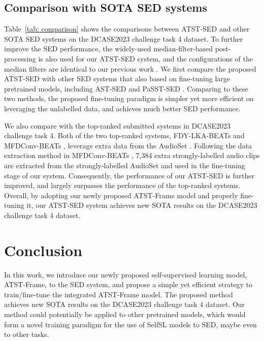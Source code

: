 \documentclass{article}
\begin{document}
\subsection{Comparison with SOTA SED systems}
Table~\ref{tab: comparison} shows the comparisons between ATST-SED and other SOTA SED systems on the DCASE2023 challenge task 4 dataset. To further improve the SED performance, the widely-used median-filter-based post-processing is also used for our ATST-SED system, and the configurations of the median filters are identical to our previous work \cite{shao22rct}.  We first compare the proposed ATST-SED with other SED systems that also based on fine-tuning large pretrained models, including AST-SED \cite{li2023ast} and PaSST-SED \cite{Li2023panns}. Comparing to these two methods, the proposed fine-tuning paradigm is simpler yet more efficient on leveraging the unlabelled data, and achieves much better SED performance. 

We also compare with the top-ranked submitted systems in DCASE2023 challenge task 4. Both of the two top-ranked systems, FDY-LKA-BEATs \cite{Kim2023FDYLKA} and MFDConv-BEATs \cite{Zhang2023MFD}, leverage extra data from the AudioSet \cite{gemmeke2017audio, hershey2021audiosetstrong}. Following the data extraction method in MFDConv-BEATs \cite{Zhang2023MFD}, 7,384 extra strongly-labelled audio clips are extracted from the strongly-labelled AudioSet and used in the fine-tuning stage of our system. Consequently, the performance of our ATST-SED is further improved, and largely surpasses the performance of the top-ranked systems. Overall, by adopting our newly proposed ATST-Frame model and properly fine-tuning it, our ATST-SED system achieves new SOTA results on the DCASE2023 challenge task 4 dataset. 




\section{Conclusion}
\label{sec: conclusion}
In this work, we introduce our newly proposed self-supervised learning model, ATST-Frame, to the SED system, and propose a simple yet efficient strategy to train/fine-tune the integrated ATST-Frame model. The proposed method achieves new SOTA results on the DCASE2023 challenge task 4 dataset.
Our method could potentially be applied to other pretrained models, which would form a novel training paradigm for the use of SelfSL models to SED, maybe even to other tasks.

\clearpage


\end{document}
